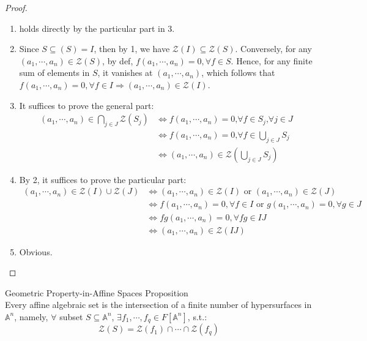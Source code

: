 \begin{proof}
    \begin{enumerate}
        \item holds directly by the particular part in 3.
        \item Since $S \subseteq (S)= I$, then by 1, we have $\mathcal{Z}(I) \subseteq \mathcal{Z}(S)$. Conversely, for any $(a_1 ,\cdots, a_n) \in \mathcal{Z}(S)$, by def,  $f(a_1 ,\cdots, a_n)=0, \forall f\in S$. Hence, for any finite sum of elements in $S$, it vanishes at $(a_1 ,\cdots, a_n)$, which follows that $f(a_1 ,\cdots, a_n)=0, \forall f\in I \Rightarrow (a_1 ,\cdots, a_n) \in \mathcal{Z}(I)$.

        \item It suffices to prove the general part:
        \begin{align*}
            (a_1 ,\cdots, a_n) \in \bigcap_{j \in J} \mathcal{Z} (S_j) &\Leftrightarrow f(a_1 ,\cdots, a_n)=0 \text{,} \forall f\in S_j \text{,} \forall j\in J\\
            &\Leftrightarrow f(a_1 ,\cdots, a_n)=0 \text{,} \forall f\in \bigcup_{j \in J} S_j\\
            &\Leftrightarrow (a_1 ,\cdots, a_n) \in \mathcal{Z} (\bigcup_{j \in J}S_j)
        \end{align*}

        \item By 2, it suffices to prove the particular part:
        \begin{align*}
            (a_1 ,\cdots, a_n) \in \mathcal{Z}(I) \cup \mathcal{Z}(J) &\Leftrightarrow (a_1 ,\cdots, a_n) \in \mathcal{Z}(I) \text{ or } (a_1 ,\cdots, a_n) \in \mathcal{Z}(J) \\
            & \Leftrightarrow f(a_1 ,\cdots, a_n) =0 ,\forall f\in I \text{ or } g(a_1 ,\cdots, a_n) =0 ,\forall g\in J\\
            &\Leftrightarrow fg(a_1 ,\cdots, a_n) =0 ,\forall fg\in IJ\\
            &\Leftrightarrow (a_1 ,\cdots, a_n) \in \mathcal{Z}(IJ)
        \end{align*}

        \item Obvious.
    \end{enumerate}
\end{proof}

\begin{proposition}{Geometric Property-in-Affine Spaces Proposition}\\
Every affine algebraic set is the intersection of a finite number of hypersurfaces in $\mathbb{A}^n$, namely, $\forall$ subset $S \subseteq \mathbb{A}^n$, $\exists f_1 ,\cdots, f_q \in F[\mathbb{A}^n]$, s.t.:
$$\mathcal{Z}(S)= \mathcal{Z}(f_1) \cap \cdots \cap \mathcal{Z}(f_q)$$
\end{proposition}

